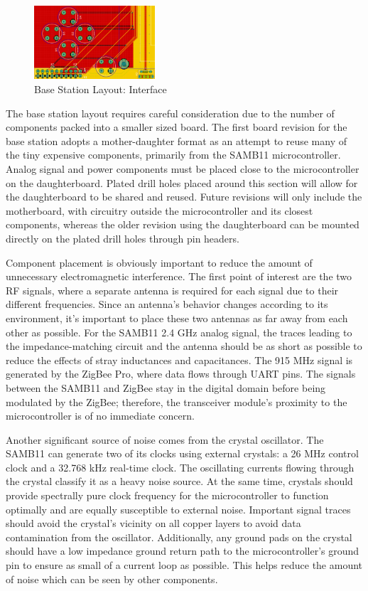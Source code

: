 \documentclass[journal,compsoc]{IEEEtran}
\begin{document}
\begin{figure}[ht] 	%
\centering
\includegraphics[width=0.4\textwidth]{base-layout-interface.PNG}
\caption{ \space Base Station Layout: Interface}
\label{base-lay-btn}
\end{figure}

The base station layout requires careful consideration due to the number of components packed into a smaller sized board.  The first board revision for the base station adopts a mother-daughter format as an attempt to reuse many of the tiny expensive components, primarily from the SAMB11 microcontroller.  Analog signal and power components must be placed close to the microcontroller on the daughterboard.  Plated drill holes placed around this section will allow for the daughterboard to be shared and reused.  Future revisions will only include the motherboard, with circuitry outside the microcontroller and its closest components, whereas the older revision using the daughterboard can be mounted directly on the plated drill holes through pin headers.

Component placement is obviously important to reduce the amount of unnecessary electromagnetic interference.  The first point of interest are the two RF signals, where a separate antenna is required for each signal due to their different frequencies.  Since an antenna’s behavior changes according to its environment, it’s important to place these two antennas as far away from each other as possible.  For the SAMB11 2.4 GHz analog signal, the traces leading to the impedance-matching circuit and the antenna should be as short as possible to reduce the effects of stray inductances and capacitances.  The 915 MHz signal is generated by the ZigBee Pro, where data flows through UART pins.  The signals between the SAMB11 and ZigBee stay in the digital domain before being modulated by the ZigBee;  therefore, the transceiver module’s proximity to the microcontroller is of no immediate concern.

Another significant source of noise comes from the crystal oscillator.  The SAMB11 can generate two of its clocks using external crystals: a 26 MHz control clock and a 32.768 kHz real-time clock.  The oscillating currents flowing through the crystal classify it as a heavy noise source.  At the same time, crystals should provide spectrally pure clock frequency for the microcontroller to function optimally and are equally susceptible to external noise.  Important signal traces should avoid the crystal’s vicinity on all copper layers to avoid data contamination from the oscillator.  Additionally, any ground pads on the crystal should have a low impedance ground return path to the microcontroller’s ground pin to ensure as small of a current loop as possible.  This helps reduce the amount of noise which can be seen by other components.
\end{document}

